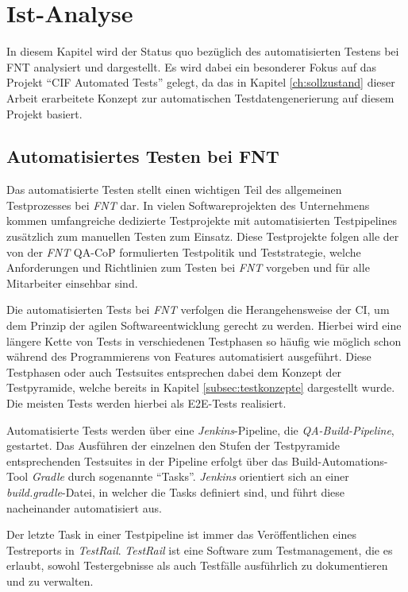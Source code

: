 
\chapter{Ist-Analyse}\label{ch:istanalyse}
In diesem Kapitel wird der Status quo bezüglich des automatisierten Testens bei FNT analysiert und dargestellt. Es wird dabei ein besonderer Fokus auf das Projekt \enquote{CIF Automated Tests} gelegt, da das in Kapitel \ref{ch:sollzustand} dieser Arbeit erarbeitete Konzept zur automatischen Testdatengenerierung auf diesem Projekt basiert.

\section{Automatisiertes Testen bei FNT}\label{sec:autotestsfnt}
Das automatisierte Testen stellt einen wichtigen Teil des allgemeinen Testprozesses bei \textit{FNT} dar. In vielen Softwareprojekten des Unternehmens kommen umfangreiche dedizierte Testprojekte mit automatisierten Testpipelines zusätzlich zum manuellen Testen zum Einsatz. Diese Testprojekte folgen alle der von der \textit{FNT} \ac{QA}-\ac{CoP} formulierten Testpolitik und Teststrategie, welche Anforderungen und Richtlinien zum Testen bei \textit{FNT} vorgeben und für alle Mitarbeiter einsehbar sind. \cite{fnt:2020} \cite{fntstrat:2021}

Die automatisierten Tests bei \textit{FNT} verfolgen die Herangehensweise der \ac{CI}, um dem Prinzip der agilen Softwareentwicklung gerecht zu werden. \cite{fntstrat:2021} Hierbei wird eine längere Kette von Tests in verschiedenen Testphasen so häufig wie möglich schon während des Programmierens von Features automatisiert ausgeführt. Diese Testphasen oder auch Testsuites entsprechen dabei dem Konzept der Testpyramide, welche bereits in Kapitel \ref{subsec:testkonzepte} dargestellt wurde. \cite{fntstrat:2021} Die meisten Tests werden hierbei als \ac{E2E}-Tests realisiert.

Automatisierte Tests werden über eine \textit{Jenkins}-Pipeline, die \textit{QA-Build-Pipeline}, gestartet. Das Ausführen der einzelnen den Stufen der Testpyramide entsprechenden Testsuites in der Pipeline erfolgt über das Build-Automations-Tool \textit{Gradle} durch sogenannte \enquote{Tasks}. \textit{Jenkins} orientiert sich an einer \textit{build.gradle}-Datei, in welcher die Tasks definiert sind, und führt diese nacheinander automatisiert aus.

Der letzte Task in einer Testpipeline ist immer das Veröffentlichen eines Testreports in \textit{TestRail}. \textit{TestRail} ist eine Software zum Testmanagement, die es erlaubt, sowohl Testergebnisse als auch Testfälle ausführlich zu dokumentieren und zu verwalten. \cite{testrail:2022} \cite{fntstrat:2021}

